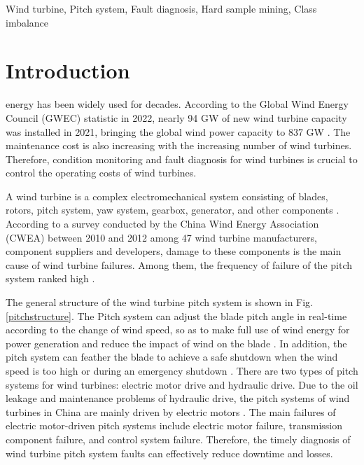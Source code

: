 \documentclass[lettersize,journal]{IEEEtran}
\begin{document}
\begin{abstract}
To evaluate the effectiveness of the proposed method, two real datasets comprising wind turbine pitch system cog belt fracture data are utilized. The fault diagnosis performance of the proposed method is compared against existing methods, and the results demonstrate its superior performance. The proposed approach exhibits significant improvements in fault diagnosis performance, providing promising prospects for enhancing the reliability and efficiency of wind turbine pitch system fault diagnosis.

\end{abstract}

\begin{IEEEkeywords}
Wind turbine, Pitch system, Fault diagnosis, Hard sample mining, Class imbalance
\end{IEEEkeywords}

\section{Introduction}%
 energy has been widely used for decades. According to the Global Wind Energy Council (GWEC) statistic in 2022, nearly 94 GW of new wind turbine capacity was installed in 2021, bringing the global wind power capacity to 837 GW \cite{gwec2022global}. The maintenance cost is also increasing with the increasing number of wind turbines. Therefore, condition monitoring and fault diagnosis for wind turbines is crucial to control the operating costs of wind turbines. 

A wind turbine is a complex electromechanical system consisting of blades, rotors, pitch system, yaw system, gearbox, generator, and other components \cite{qiao2015survey}. According to a survey conducted by the China Wind Energy Association (CWEA) between 2010 and 2012 among 47 wind turbine manufacturers, component suppliers and developers, damage to these components is the main cause of wind turbine failures. Among them, the frequency of failure of the pitch system ranked high \cite{lin2016fault}. 

The general structure of the wind turbine pitch system is shown in Fig.\ref{pitchstructure}. The Pitch system can adjust the blade pitch angle in real-time according to the change of wind speed, so as to make full use of wind energy for power generation and reduce the impact of wind on the blade \cite{perez2013wind}. In addition, the pitch system can feather the blade to achieve a safe shutdown when the wind speed is too high or during an emergency shutdown \cite{hansen2004review}. There are two types of pitch systems for wind turbines: electric motor drive and hydraulic drive. Due to the oil leakage and maintenance problems of hydraulic drive, the pitch systems of wind turbines in China are mainly driven by electric motors \cite {lin2016fault}. The main failures of electric motor-driven pitch systems include electric motor failure, transmission component failure, and control system failure. Therefore, the timely diagnosis of wind turbine pitch system faults can effectively reduce downtime and losses. 
\end{document}
